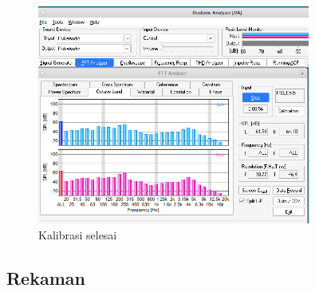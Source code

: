 \documentclass{article}
\begin{document}
\begin{itemize}
		\begin{figure}[H]
			\centering
			\includegraphics[width=0.8\textwidth,angle=0]{images/rta_fft}
			\caption{Kalibrasi selesai}
		\end{figure}

	\end{itemize}

%
%
%
%
%
%
%
%

	\newpage
	\subsection{Rekaman}
\end{document}
